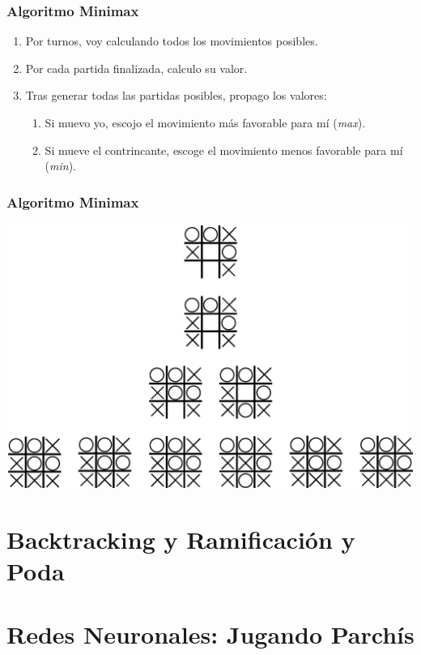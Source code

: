 \documentclass[a4paper,t,xcolor=pst,dvips,colortheme]{beamer}
\begin{document}
\begin{frame}[c]
    \frametitle{Algoritmo Minimax}
    \begin{enumerate}[<+->]
        \item Por turnos, voy calculando todos los movimientos posibles.
        \item Por cada partida finalizada, calculo su valor. 
        \item Tras generar todas las partidas posibles, propago los valores:
        \begin{enumerate}
            \item Si muevo yo, escojo el movimiento más favorable para mí (\emph{max}).
            \item Si mueve el contrincante, escoge el movimiento menos favorable para mí (\emph{min}).
        \end{enumerate}
    \end{enumerate}
\end{frame}

\begin{frame}[c]
    \frametitle{Algoritmo Minimax}
    \begin{center}
        \includegraphics[width=0.90\linewidth]{images/minimax/minimax.eps}
    \end{center}
\end{frame}

\section{Backtracking y Ramificación y Poda}

\section{Redes Neuronales: Jugando Parchís}
\end{document}
